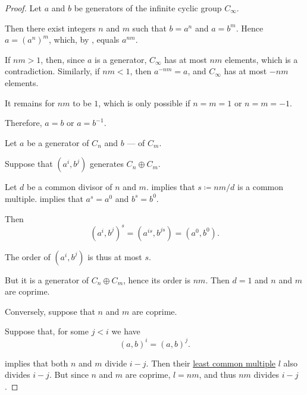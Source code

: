 \begin{proof}
   Let \( a \) and \( b \) be generators of the infinite cyclic group \( C_\infty \).

  Then there exist integers \( n \) and \( m \) such that \( b = a^n \) and \( a = b^m \). Hence \( a = (a^n)^m \), which, by , equals \( a^{nm} \).

  If \( nm > 1 \), then, since \( a \) is a generator, \( C_\infty \) has at most \( nm \) elements, which is a contradiction. Similarly, if \( nm < 1 \), then \( a^{-nm} = a \), and \( C_\infty \) has at most \( -nm \) elements.

  It remains for \( nm \) to be \( 1 \), which is only possible if \( n = m = 1 \) or \( n = m = -1 \).

  Therefore, \( a = b \) or \( a = b^{-1} \).

   Let \( a \) be a generator of \( C_n \) and \( b \) --- of \( C_m \).

  \SufficiencySubProof* Suppose that \( (a^i, b^j) \) generates \( C_n \oplus C_m \).

  Let \( d \) be a common divisor of \( n \) and \( m \).  implies that \( s \coloneqq nm / d \) is a common multiple.  implies that \( a^s = a^0 \) and \( b^s = b^0 \).

  Then
  \begin{equation*}
    (a^i, b^j)^s = (a^{is}, b^{js}) = (a^0, b^0).
  \end{equation*}

  The order of \( (a^i, b^j) \) is thus at most \( s \).

  But it is a generator of \( C_n \oplus C_m \), hence its order is \( nm \). Then \( d = 1 \) and \( n \) and \( m \) are coprime.

  \NecessitySubProof* Conversely, suppose that \( n \) and \( m \) are coprime.

  Suppose that, for some \( j < i \) we have
  \begin{equation*}
    (a, b)^i = (a, b)^j.
  \end{equation*}

   implies that both \( n \) and \( m \) divide \( i - j \). Then their \hyperref[def:lcm]{least common multiple} \( l \) also divides \( i - j \). But since \( n \) and \( m \) are coprime, \( l = nm \), and thus \( nm \) divides \( i - j \).


\end{proof}
